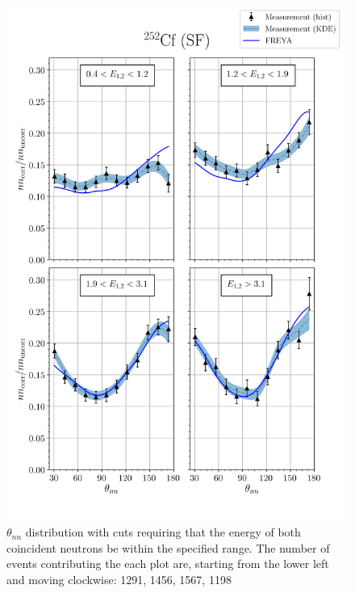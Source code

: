 \begin{figure}
\centering
    \includegraphics[width = 1.1\textwidth]{Content/Results/FinalCf252Resultw_freya2KDE.png}
    \caption{$\theta_{nn}$ distribution with cuts requiring that the energy of both coincident neutrons be within the specified range.
    The number of events contributing the each plot are, starting from the lower left and moving clockwise: 1291, 1456, 1567, 1198}
    \label{fig:Cf(2)}
\end{figure}
